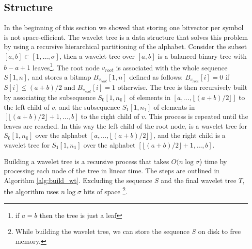 \subsection{Structure}

In the beginning of this section we showed that storing one bitvector per symbol is not space-efficient. The wavelet tree is a data structure that solves this problem by using a recursive hierarchical partitioning of the alphabet. Consider the subset $[a,b] \subset [1, \dots, \sigma]$, then a wavelet tree over $[a,b]$ is a balanced binary tree with $b-a+1$ leaves\footnote{if $a=b$ then the tree is just a leaf}. The root node $v_{root}$ is associated with the whole sequence $S[1,n]$, and stores a bitmap $B_{v_{root}}[1,n]$ defined as follows: $B_{v_{root}}[i] = 0$ if $S[i] \leq (a+b)/2$ and $B_{v_{root}}[i] = 1$ otherwise. The tree is then recursively built by associating the subsequence $S_0[1,n_0]$ of elements in $[a, \dots,\lfloor (a+b)/2 \rfloor ]$ to the left child of $v$, and the subsequence $S_1[1,n_1]$ of elements in $[\lfloor (a+b)/2 \rfloor +1,\dots, b]$ to the right child of $v$. This process is repeated until the leaves are reached. In this way the left child of the root node, is a wavelet tree for $S_0[1,n_0]$ over the alphabet $[a,\dots, \lfloor (a+b)/2 \rfloor ]$, and the right child is a wavelet tree for $S_1[1,n_1]$ over the alphabet $[\lfloor (a+b)/2 \rfloor +1,\dots, b]$. \cite{WTForALL} \vspace{0.4cm}

\noindent Building a wavelet tree is a recursive process that takes $O(n\log \sigma$) time by processing each node of the tree in linear time. The steps are outlined in Algorithm \ref{alg:build_wt}. Excluding the sequence $S$ and the final wavelet tree $T$, the algorithm uses $n \log \sigma$ bits of space \footnote{While building the wavelet tree, we can store the sequence $S$ on disk to free memory.}.

